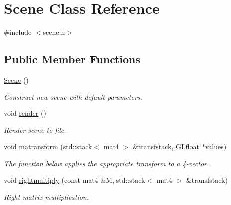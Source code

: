 \hypertarget{class_scene}{}\section{Scene Class Reference}
\label{class_scene}


{\ttfamily \#include $<$scene.\+h$>$}

\subsection*{Public Member Functions}
\begin{DoxyCompactItemize}
\item 
\mbox{\label{class_scene_ad10176d75a9cc0da56626f682d083507}} 
\mbox{\hyperlink{class_scene_ad10176d75a9cc0da56626f682d083507}{Scene}} ()
\begin{DoxyCompactList}\small\item\em Construct new scene with default parameters. \end{DoxyCompactList}\item 
\mbox{\label{class_scene_a4ddf2d16f371ee9533b3faf1dd5ddfb1}} 
void \mbox{\hyperlink{class_scene_a4ddf2d16f371ee9533b3faf1dd5ddfb1}{render}} ()
\begin{DoxyCompactList}\small\item\em Render scene to file. \end{DoxyCompactList}\item 
\mbox{\label{class_scene_a4eda4f1e276891972df0227caeba28d8}} 
void \mbox{\hyperlink{class_scene_a4eda4f1e276891972df0227caeba28d8}{matransform}} (std\+::stack$<$ mat4 $>$ \&transfstack, G\+Lfloat $\ast$values)
\begin{DoxyCompactList}\small\item\em The function below applies the appropriate transform to a 4-\/vector. \end{DoxyCompactList}\item 
\mbox{\label{class_scene_a51f2ec69429e96de84ec36ae929dd1e6}} 
void \mbox{\hyperlink{class_scene_a51f2ec69429e96de84ec36ae929dd1e6}{rightmultiply}} (const mat4 \&M, std\+::stack$<$ mat4 $>$ \&transfstack)
\begin{DoxyCompactList}\small\item\em Right matrix multiplication. \end{DoxyCompactList}\item 

\end{DoxyCompactItemize}
